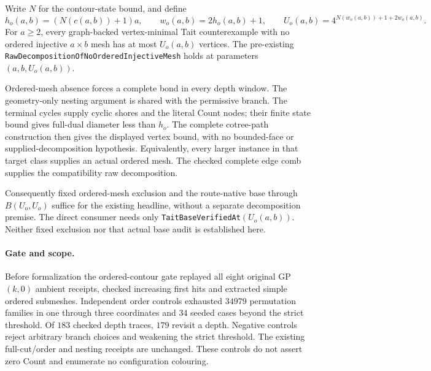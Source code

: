 \begin{theorem}
Write $N$ for the contour-state bound, and define
\[
 h_o(a,b)=(N(c(a,b))+1)a,\qquad w_o(a,b)=2h_o(a,b)+1,
 \qquad U_o(a,b)=4^{N(w_o(a,b))+1+2w_o(a,b)}.
\]
For $a\ge2$, every graph-backed vertex-minimal Tait counterexample with
no ordered injective $a\times b$ mesh has at most $U_o(a,b)$ vertices.
The pre-existing \texttt{RawDecompositionOfNoOrderedInjectiveMesh}
holds at parameters $(a,b,U_o(a,b))$.
\end{theorem}

Ordered-mesh absence forces a complete bond in every depth window.
The geometry-only nesting argument is shared with the permissive branch.
The terminal cycles supply cyclic shores and the literal Count nodes;
their finite state bound gives full-dual diameter less than $h_o$.
The complete cotree-path construction then gives the displayed vertex
bound, with no bounded-face or supplied-decomposition hypothesis.
Equivalently, every larger instance in that target class supplies an
actual ordered mesh.
The checked complete edge comb supplies the compatibility raw decomposition.

Consequently fixed ordered-mesh exclusion and the route-native base
through $B(U_o,U_o)$ suffice for the existing headline, without a separate
decomposition premise.
The direct consumer needs only \texttt{TaitBaseVerifiedAt}$(U_o(a,b))$.
Neither fixed exclusion nor that actual base audit is established here.

\paragraph{Gate and scope.}
Before formalization the ordered-contour gate replayed all eight original
GP$(k,0)$ ambient receipts, checked increasing first hits and extracted
simple ordered submeshes.  Independent order controls exhausted $34979$
permutation families in one through three coordinates and $34$ seeded
cases beyond the strict threshold.  Of $183$ checked depth traces,
$179$ revisit a depth.  Negative controls reject arbitrary branch choices
and weakening the strict threshold.  The existing full-cut/order and
nesting receipts are unchanged.  These controls do not assert zero Count
and enumerate no configuration colouring.

